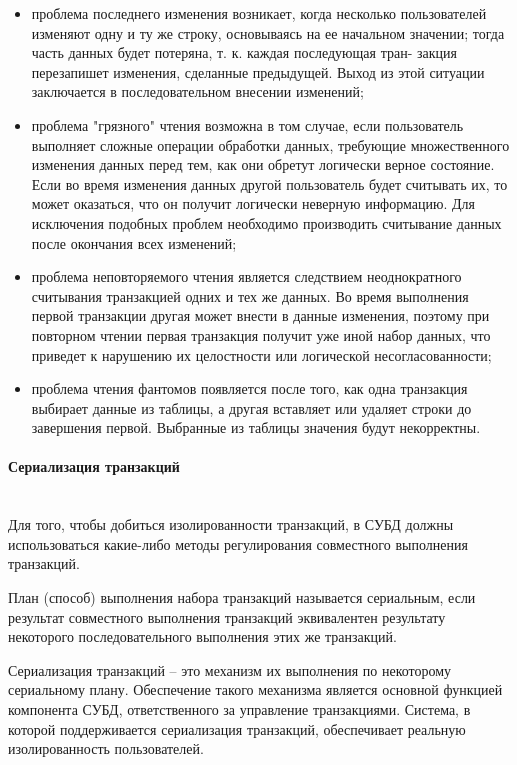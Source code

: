 \begin{itemize}
\item проблема последнего изменения возникает, когда несколько пользователей изменяют одну и ту же строку, основываясь на ее начальном значении; тогда часть данных будет потеряна, т. к. каждая последующая тран-
закция перезапишет изменения, сделанные предыдущей. Выход из этой
ситуации заключается в последовательном внесении изменений;
\item проблема "грязного" чтения возможна в том случае, если пользователь
выполняет сложные операции обработки данных, требующие множественного изменения данных перед тем, как они обретут логически верное
состояние. Если во время изменения данных другой пользователь будет
считывать их, то может оказаться, что он получит логически неверную
информацию. Для исключения подобных проблем необходимо производить считывание данных после окончания всех изменений;
\item проблема неповторяемого чтения является следствием неоднократного
считывания транзакцией одних и тех же данных. Во время выполнения
первой транзакции другая может внести в данные изменения, поэтому при
повторном чтении первая транзакция получит уже иной набор данных,
что приведет к нарушению их целостности или логической несогласованности;
\item проблема чтения фантомов появляется после того, как одна транзакция
выбирает данные из таблицы, а другая вставляет или удаляет строки до
завершения первой. Выбранные из таблицы значения будут некорректны.
\end{itemize}

\paragraph{Сериализация транзакций} ~\\

Для того, чтобы добиться изолированности транзакций, в СУБД должны использоваться какие-либо методы регулирования совместного выполнения транзакций.

План (способ) выполнения набора транзакций называется сериальным, если результат совместного выполнения транзакций эквивалентен результату некоторого последовательного выполнения этих же транзакций.

Сериализация транзакций -- это механизм их выполнения по некоторому сериальному плану. Обеспечение такого механизма является основной функцией компонента СУБД, ответственного за управление транзакциями. Система, в которой поддерживается сериализация транзакций, обеспечивает реальную изолированность пользователей.

